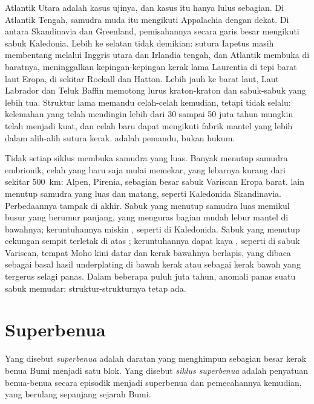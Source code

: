 Atlantik Utara adalah kasus ujinya, dan kasus itu hanya lulus sebagian. Di Atlantik Tengah,
samudra muda itu mengikuti Appalachia dengan dekat. Di antara Skandinavia dan Greenland, pemisahannya
secara garis besar mengikuti sabuk Kaledonia. Lebih ke selatan tidak demikian: sutura Iapetus masih membentang
melalui Inggris utara dan Irlandia tengah, dan Atlantik membuka di baratnya, meninggalkan
kepingan-kepingan kerak lama Laurentia di tepi barat laut Eropa, di sekitar Rockall dan Hatton.
Lebih jauh ke barat laut, Laut Labrador dan Teluk Baffin memotong lurus kraton-kraton dan sabuk-sabuk
yang lebih tua. Struktur lama memandu celah-celah kemudian, tetapi tidak selalu: kelemahan yang telah mendingin lebih
dari 30 sampai 50 juta tahun mungkin telah menjadi kuat, dan celah baru dapat mengikuti fabrik mantel
yang lebih dalam alih-alih sutura kerak.  adalah pemandu, bukan hukum.

Tidak setiap siklus membuka samudra yang luas. Banyak  menutup samudra embrionik, celah yang baru saja
mulai memekar, yang lebarnya kurang dari sekitar \qty{500}{km}: Alpen, Pirenia, sebagian besar
sabuk Variscan Eropa barat.  lain menutup samudra yang luas dan matang, seperti
Kaledonida Skandinavia. Perbedaannya tampak di akhir. Sabuk yang menutup samudra luas memikul
busur yang berumur panjang, yang menguras bagian mudah lebur mantel di bawahnya; keruntuhannya miskin
, seperti di Kaledonida. Sabuk yang menutup cekungan sempit terletak di atas ; keruntuhannya
dapat kaya , seperti di sabuk Variscan, tempat Moho kini datar dan
kerak bawahnya berlapis, yang dibaca sebagai basal hasil underplating di bawah kerak atau sebagai kerak bawah yang tergerus
selagi panas. Dalam beberapa puluh juta tahun, anomali panas
suatu sabuk memudar; struktur-strukturnya tetap ada.

\section{Superbenua}\label{sec:b2:wilson-cycle:supercontinents}

\begin{definition}\label{def:b2:wilson-cycle:supercontinent}
Yang disebut \emph{superbenua} adalah daratan yang menghimpun sebagian besar kerak benua
Bumi menjadi satu blok. Yang disebut \emph{siklus superbenua} adalah penyatuan
benua-benua secara episodik menjadi superbenua dan pemecahannya kemudian, yang
berulang sepanjang sejarah Bumi.
\end{definition}

